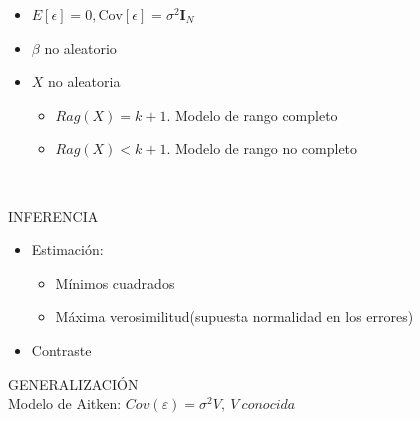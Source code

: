 \documentclass[10pt,a4paper]{book}
\begin{document}
\begin{itemize}
\item $E[\epsilon]=0,\mathrm{Cov}[\epsilon]=\sigma^2\mathbf{I}_N$
\item $\beta$ no aleatorio
\item $X$ no aleatoria
\begin{itemize}
\item $Rag(X)=k+1$. Modelo de rango completo
\item $Rag(X)<k+1$. Modelo de rango no completo
\end{itemize}
\end{itemize}
\ \\
\begin{center}
INFERENCIA
\end{center}
\begin{itemize}
\item Estimación:
\begin{itemize}
\item Mínimos cuadrados
\item Máxima verosimilitud(supuesta normalidad en los errores)
\end{itemize}
\item Contraste
\end{itemize}
\begin{center}
GENERALIZACIÓN
\ \\
Modelo de Aitken: $Cov(\varepsilon)=\sigma^2V,\ V\ conocida$
\end{center}
\end{document}
